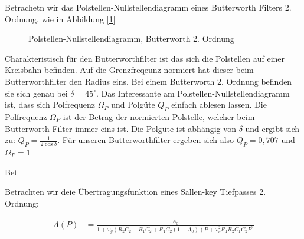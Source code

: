 Betrachetn wir das Polstellen-Nullstellendiagramm eines Butterworth Filters 2. Ordnung, wie in Abbildung [\ref{fig:filter_polnul}]


\begin{figure}[H]
\centering
{}
\caption{Polstellen-Nullstellendiagramm, Butterworth 2. Ordnung}
\label{fig:filter_polnul}
\end{figure}



Charakteristisch für den Butterworthfilter ist das sich die Polstellen auf einer Kreisbahn befinden. Auf die Grenzfreqeunz normiert hat dieser beim Butterworthfilter den Radius
eins. Bei einem Butterworth 2. Ordnung befinden sie sich genau bei $\delta=45^\circ$. Das Interessante am Polstellen-Nullstellendiagramm ist, dass sich Polfrequenz $\Omega_P$ und 
Polgüte $Q_P$ einfach ablesen lassen. Die Polfrequenz $\Omega_P$ ist der Betrag der normierten Polstelle, welcher beim Butterworth-Filter immer eins ist.
Die Polgüte ist abhängig von $\delta$ und ergibt sich zu: $Q_P=\frac{1}{2\cos{\delta}}$. Für unseren Butterworthfilter ergeben sich also $Q_P=0,707$ und $\Omega_P=1$



Bet

Betrachten wir deie Übertragungsfunktion eines Sallen-key Tiefpasses 2. Ordnung:

\begin{align*}
A(P)&=\frac{A_0}{1+\omega_g (R_2 C_2 + R_1 C_2 + R_1 C_2(1-A_0))P + \omega_g^2R_1 R_2 C_1C_2P^2}
\end{align*}

